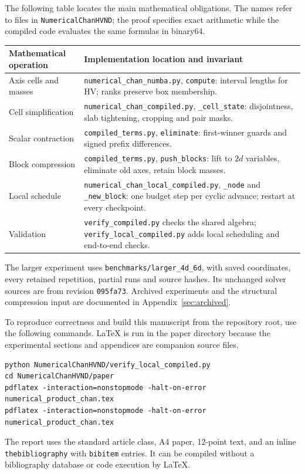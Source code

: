 \documentclass[12pt,a4paper]{article}
\theoremstyle{definition}
\begin{document}
The following table locates the main mathematical obligations. The names
refer to files in \texttt{NumericalChanHVND}; the proof specifies exact
arithmetic while the compiled code evaluates the same formulas in binary64.
\begin{center}
\small
\begin{tabularx}{\linewidth}{@{}>{\raggedright\arraybackslash}p{.28\linewidth}>{\raggedright\arraybackslash}X@{}}
\toprule
Mathematical operation & Implementation location and invariant\\\midrule
Axis cells and masses & \texttt{numerical\_chan\_numba.py},
\texttt{compute}: interval lengths for HV; ranks preserve box membership.\\
Cell simplification & \texttt{numerical\_chan\_compiled.py},
\texttt{\_cell\_state}: disjointness, slab tightening, cropping and pair masks.\\
Scalar contraction & \texttt{compiled\_terms.py},
\texttt{eliminate}: first-winner guards and signed prefix differences.\\
Block compression & \texttt{compiled\_terms.py},
\texttt{push\_blocks}: lift to $2d$ variables, eliminate old axes, retain block masses.\\
Local schedule & \texttt{numerical\_chan\_local\_compiled.py},
\texttt{\_node} and \texttt{\_new\_block}: one budget step per cyclic advance;
restart at every checkpoint.\\
Validation & \texttt{verify\_compiled.py} checks the shared algebra;
\texttt{verify\_local\_compiled.py} adds local scheduling and end-to-end checks.\\
\bottomrule
\end{tabularx}
\end{center}

The larger experiment uses \texttt{benchmarks/larger\_4d\_6d}, with
saved coordinates, every retained repetition, partial runs and source
hashes. Its unchanged solver sources are from revision \texttt{095fa73}.
Archived experiments and the structural compression input are
documented in Appendix~\ref{sec:archived}.

To reproduce correctness and build this manuscript from the repository
root, use the following commands. LaTeX is run in the paper directory
because the experimental sections and appendices are companion source files.
\begin{lstlisting}
python NumericalChanHVND/verify_local_compiled.py
cd NumericalChanHVND/paper
pdflatex -interaction=nonstopmode -halt-on-error numerical_product_chan.tex
pdflatex -interaction=nonstopmode -halt-on-error numerical_product_chan.tex
\end{lstlisting}
The report uses the standard article class, A4 paper, 12-point text, and
an inline \texttt{thebibliography} with \texttt{bibitem} entries. It can
be compiled without a bibliography database or code execution by LaTeX.
\end{document}

